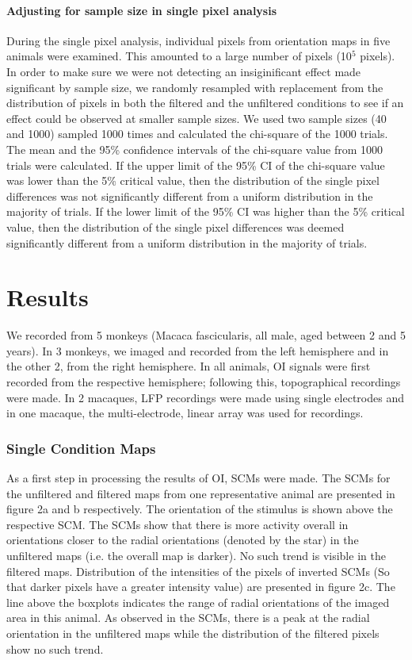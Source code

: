 		\paragraph{Adjusting for sample size in single pixel analysis}
		
		During the single pixel analysis, individual pixels from orientation maps in five animals were examined. This amounted to a large number of pixels (10$^5$ pixels). In order to make sure we were not detecting an insiginificant effect made significant by sample size, we randomly resampled with replacement from the distribution of pixels in both the filtered and the unfiltered conditions to see if an effect could be observed at smaller sample sizes. We used two sample sizes (40 and 1000) sampled 1000 times and calculated the chi-square of the 1000 trials. The mean and the 95\% confidence intervals of the chi-square value from 1000 trials were calculated. If the upper limit of the 95\% CI of the chi-square value was lower than the 5\% critical value, then the distribution of the single pixel differences was not significantly different from a uniform distribution in the majority of trials. If the lower limit of the 95\% CI was higher than the 5\% critical value, then the distribution of the single pixel differences was deemed significantly different from a uniform distribution in the majority of trials.
		\pagebreak
		
	\section{Results}
		We recorded from 5 monkeys (Macaca fascicularis, all male, aged between 2 and 5 years). In 3 monkeys, we imaged and recorded from the left hemisphere and in the other 2, from the right hemisphere. In all animals, OI signals were first recorded from the respective hemisphere; following this, topographical recordings were made. In 2 macaques, LFP recordings were made using single electrodes and in one macaque, the multi-electrode, linear array was used for recordings.
	
		\subsubsection{Single Condition Maps}
		As a first step in processing the results of OI, SCMs were made. The SCMs for the unfiltered and filtered maps from one representative animal are presented in figure 2a and b respectively. The orientation of the stimulus is shown above the respective SCM. The SCMs show that there is more activity overall in orientations closer to the radial orientations (denoted by the star) in the unfiltered maps (i.e. the overall map is darker). No such trend is visible in the filtered maps. Distribution of the intensities of the pixels of inverted SCMs (So that darker pixels have a greater intensity value) are presented in figure 2c. The line above the boxplots indicates the range of radial orientations of the imaged area in this animal. As observed in the SCMs, there is a peak at the radial orientation in the unfiltered maps while the distribution of the filtered pixels show no such trend.
			
